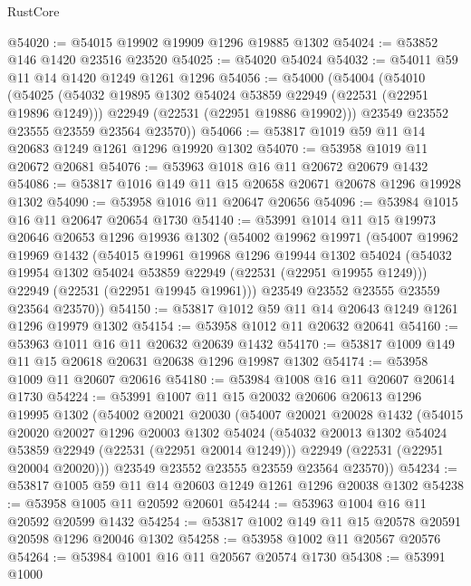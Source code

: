 \begin{lexlean}{RustCore}
\begin{coremodule}
@54020 := @54015 @19902 @19909 @1296 @19885 @1302
@54024 := @53852 @146 @1420 @23516 @23520
@54025 := @54020 @54024
@54032 := @54011 @59 @11 @14 @1420 @1249 @1261 @1296
@54056 := @54000
    (@54004
      (@54010
        (@54025
          (@54032 @19895 @1302 @54024 @53859 @22949 (@22531 (@22951 @19896 @1249)))
          @22949
          (@22531 (@22951 @19886 @19902)))
        @23549
        @23552
        @23555
        @23559
        @23564
        @23570))
@54066 := @53817 @1019 @59 @11 @14 @20683 @1249 @1261 @1296 @19920 @1302
@54070 := @53958 @1019 @11 @20672 @20681
@54076 := @53963 @1018 @16 @11 @20672 @20679 @1432
@54086 := @53817 @1016 @149 @11 @15 @20658 @20671 @20678 @1296 @19928 @1302
@54090 := @53958 @1016 @11 @20647 @20656
@54096 := @53984 @1015 @16 @11 @20647 @20654 @1730
@54140 := @53991
    @1014
    @11
    @15
    @19973
    @20646
    @20653
    @1296
    @19936
    @1302
    (@54002
      @19962
      @19971
      (@54007
        @19962
        @19969
        @1432
        (@54015
          @19961
          @19968
          @1296
          @19944
          @1302
          @54024
          (@54032 @19954 @1302 @54024 @53859 @22949 (@22531 (@22951 @19955 @1249)))
          @22949
          (@22531 (@22951 @19945 @19961)))
        @23549
        @23552
        @23555
        @23559
        @23564
        @23570))
@54150 := @53817 @1012 @59 @11 @14 @20643 @1249 @1261 @1296 @19979 @1302
@54154 := @53958 @1012 @11 @20632 @20641
@54160 := @53963 @1011 @16 @11 @20632 @20639 @1432
@54170 := @53817 @1009 @149 @11 @15 @20618 @20631 @20638 @1296 @19987 @1302
@54174 := @53958 @1009 @11 @20607 @20616
@54180 := @53984 @1008 @16 @11 @20607 @20614 @1730
@54224 := @53991
    @1007
    @11
    @15
    @20032
    @20606
    @20613
    @1296
    @19995
    @1302
    (@54002
      @20021
      @20030
      (@54007
        @20021
        @20028
        @1432
        (@54015
          @20020
          @20027
          @1296
          @20003
          @1302
          @54024
          (@54032 @20013 @1302 @54024 @53859 @22949 (@22531 (@22951 @20014 @1249)))
          @22949
          (@22531 (@22951 @20004 @20020)))
        @23549
        @23552
        @23555
        @23559
        @23564
        @23570))
@54234 := @53817 @1005 @59 @11 @14 @20603 @1249 @1261 @1296 @20038 @1302
@54238 := @53958 @1005 @11 @20592 @20601
@54244 := @53963 @1004 @16 @11 @20592 @20599 @1432
@54254 := @53817 @1002 @149 @11 @15 @20578 @20591 @20598 @1296 @20046 @1302
@54258 := @53958 @1002 @11 @20567 @20576
@54264 := @53984 @1001 @16 @11 @20567 @20574 @1730
@54308 := @53991
    @1000

\end{coremodule}
\end{lexlean}
